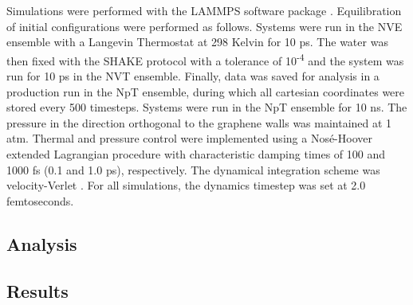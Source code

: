 \documentclass[12pt]{article}
\begin{document}
Simulations were performed with the LAMMPS software package \cite{Plimpton1995}. 
Equilibration of initial configurations were performed as follows. Systems were run in 
the NVE ensemble with a Langevin Thermostat at 298 Kelvin
for 10 ps. The water was then fixed with the SHAKE protocol \cite{Andersen1983} with a tolerance
of 10\textsuperscript{-4} and the system was run for 10 ps in the NVT ensemble.
Finally, data was saved for analysis in a production run in the NpT ensemble,
during which all cartesian coordinates were stored every 500 timesteps. 
Systems were run in the NpT ensemble for 10 ns. The 
pressure in the direction orthogonal to the graphene walls was maintained at 1 atm.
Thermal and pressure control were implemented using a Nos\' e-Hoover 
extended Lagrangian procedure \cite{Martyna1994} with characteristic damping times of 100 
and 1000 fs (0.1 and 1.0 ps), respectively. The dynamical integration 
scheme was velocity-Verlet \cite{Swope1982}.
For all simulations, the dynamics timestep was set at 2.0 femtoseconds. 

\subsection*{Analysis}

\subsection*{Results}
\end{document}
